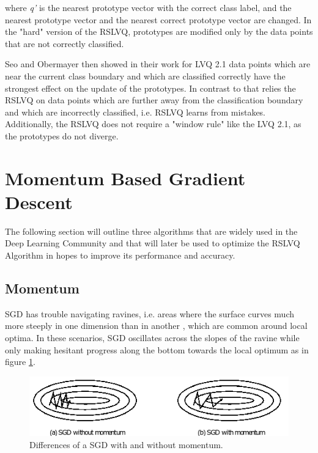 \documentclass[12pt,oneside,a4paper,parskip]{scrbook}
\begin{document}
where \textit{q'} is the nearest prototype vector with the correct class label, and the nearest prototype vector and the 
nearest correct prototype vector are changed. In the "hard" version of the RSLVQ, prototypes are modified only by the data 
points that are not correctly classified. \cite{RSLVQOrig}

Seo and Obermayer then showed in their work \cite{RSLVQOrig} for LVQ 2.1 data points which are near the current 
class boundary and which are classified correctly have the strongest effect on the update of the prototypes. In contrast to that
relies the RSLVQ on data points which are further away from the classification boundary and which are incorrectly classified,
i.e. RSLVQ learns from mistakes. Additionally, the RSLVQ does not require a "window rule" like the LVQ 2.1, as the prototypes 
do not diverge. \cite{RSLVQOrig}

\section{Momentum Based Gradient Descent}

The following section will outline three algorithms that are widely used in the Deep Learning Community and that will later
be used to optimize the RSLVQ Algorithm in hopes to improve its performance and accuracy.

\subsection{Momentum}

SGD has trouble navigating ravines, i.e. areas where the surface curves much more steeply in one dimension than in another \cite{problemSteepLearn, overvieDiffRSLVQ},
which are common around local optima. In these scenarios, SGD oscillates across the slopes of the ravine while only making 
hesitant progress along the bottom towards the local optimum as in figure \ref{fig:SGD_momentum}.

\begin{figure}[H]
  \centering
  \includegraphics[width=\columnwidth]{SGD_momentum}
  \caption[Diff. SGD moment.]{Differences of a SGD with and without momentum.\footnotemark} 
  \label{fig:SGD_momentum}
\end{figure}
\end{document}
